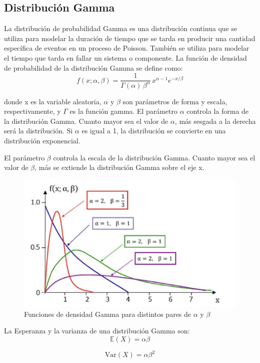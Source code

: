 \documentclass{article}
\begin{document}
\subsection{Distribución Gamma}
La distribución de probabilidad Gamma es una distribución continua que se utiliza para modelar la duración de tiempo que se tarda en producir una cantidad específica de eventos en un proceso de Poisson. También se utiliza para modelar el tiempo que tarda en fallar un sistema o componente.
La función de densidad de probabilidad de la distribución Gamma se define como:
\begin{equation}
    f(x; \alpha, \beta) = \frac{1}{\Gamma(\alpha) \, \beta^\alpha} \, x^{\alpha - 1} e^{-x/\beta}
\end{equation}

donde x es la variable aleatoria, $\alpha$ y $\beta$ son parámetros de forma y escala, respectivamente, y $\Gamma$ es la función gamma. El parámetro $\alpha$ controla la forma de la distribución Gamma. Cuanto mayor sea el valor de $\alpha$, más sesgada a la derecha será la distribución. Si $\alpha$ es igual a 1, la distribución se convierte en una distribución exponencial.

 El parámetro $\beta$ controla la escala de la distribución Gamma. Cuanto mayor sea el valor de $\beta$, más se extiende la distribución Gamma sobre el eje x.
 
\begin{figure}[H]
    \centering
    \includegraphics[width=0.5\linewidth]{Imagenes/Funciones de densidad Gamma para distintos pares de α y β.png}
    \caption{Funciones de densidad Gamma para distintos pares de $\alpha$ y $\beta$}
    \label{fig:Func.Densidad Gamma}
\end{figure}

La Esperanza y la varianza de una distribución Gamma son:
\begin{equation}
    \mathbb{E}(X) = \alpha \beta
\end{equation}

\begin{equation}
    \mathrm{Var}(X) = \alpha \beta^2
\end{equation}
\end{document}
